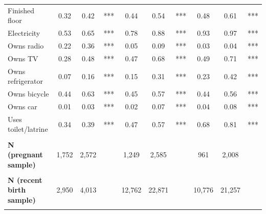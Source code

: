\begin{tabular}{lccccccccc}
Finished floor&0.32&0.42&***&0.44&0.54&***&0.48&0.61&***\\
Electricity&0.53&0.65&***&0.78&0.88&***&0.93&0.97&***\\
Owns radio&0.22&0.36&***&0.05&0.09&***&0.03&0.04&***\\
Owns TV&0.28&0.48&***&0.47&0.68&***&0.49&0.71&***\\
Owns refrigerator&0.07&0.16&***&0.15&0.31&***&0.23&0.42&***\\
Owns bicycle&0.44&0.63&***&0.45&0.57&***&0.44&0.56&***\\
Owns car&0.01&0.03&***&0.02&0.07&***&0.04&0.08&***\\
Uses toilet/latrine&0.34&0.39&***&0.47&0.57&***&0.68&0.81&***\\
&&&&&&&&&\\
\textbf{N (pregnant sample)}&1,752&2,572&&1,249&2,585&&961&2,008&\\
&&&&&&&&&\\
\textbf{N (recent birth sample)}&2,950&4,013&&12,762&22,871&&10,776&21,257&\\
&&&&&&&&&\\
\bottomrule
\end{tabular}
